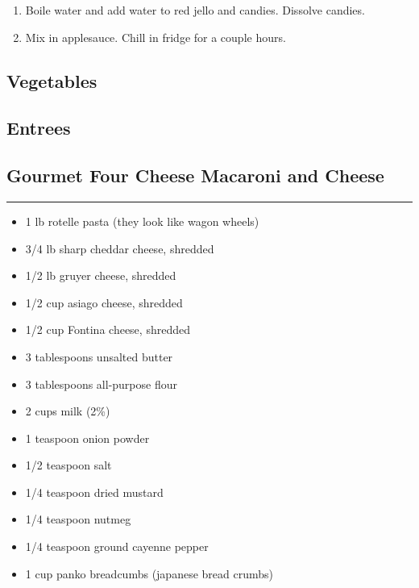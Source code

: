 \documentclass{article}
\begin{document}
\begin{enumerate}
    \item 
        Boile water and add water to red jello and candies. Dissolve candies.
    \item 
        Mix in applesauce. Chill in fridge for a couple hours.
\end{enumerate}
\newpage

\vspace*{\fill}
\begin{center}
    \section{Vegetables}
\end{center}
\vspace*{\fill}
\newpage

\vspace*{\fill}
\begin{center}
    \section{Entrees}
\end{center}
\vspace*{\fill}
\newpage

\subsection{Gourmet Four Cheese Macaroni and Cheese} 
\noindent\rule[0.5ex]{\linewidth}{1pt}

\begin{framed}
    \begin{itemize}
        \item 1 lb rotelle pasta (they look like wagon wheels)
        \item 3/4 lb sharp cheddar cheese, shredded
        \item 1/2 lb gruyer cheese, shredded
        \item 1/2 cup asiago cheese, shredded
        \item 1/2 cup Fontina cheese, shredded
        \item 3 tablespoons unsalted butter
        \item 3 tablespoons all-purpose flour
        \item 2 cups milk (2\%)
        \item 1 teaspoon onion powder
        \item 1/2 teaspoon salt
        \item 1/4 teaspoon dried mustard
        \item 1/4 teaspoon nutmeg
        \item 1/4 teaspoon ground cayenne pepper
        \item 1 cup panko breadcumbs (japanese bread crumbs)
    \end{itemize}
\end{framed}
\end{document}
